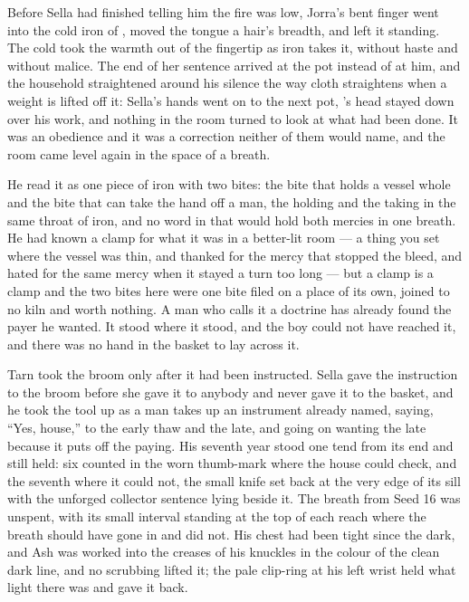 Before Sella had finished telling him the fire was low, Jorra's bent finger went into the cold iron of , moved the tongue a hair's breadth, and left it standing. The cold took the warmth out of the fingertip as iron takes it, without haste and without malice. The end of her sentence arrived at the pot instead of at him, and the household straightened around his silence the way cloth straightens when a weight is lifted off it: Sella's hands went on to the next pot, 's head stayed down over his work, and nothing in the room turned to look at what had been done. It was an obedience and it was a correction neither of them would name, and the room came level again in the space of a breath.

He read it as one piece of iron with two bites: the bite that holds a vessel whole and the bite that can take the hand off a man, the holding and the taking in the same throat of iron, and no word in  that would hold both mercies in one breath. He had known a clamp for what it was in a better-lit room --- a thing you set where the vessel was thin, and thanked for the mercy that stopped the bleed, and hated for the same mercy when it stayed a turn too long --- but a clamp is a clamp and the two bites here were one bite filed on a place of its own, joined to no kiln and worth nothing. A man who calls it a doctrine has already found the payer he wanted. It stood where it stood, and the boy could not have reached it, and there was no hand in the basket to lay across it.

Tarn took the broom only after it had been instructed. Sella gave the instruction to the broom before she gave it to anybody and never gave it to the basket, and he took the tool up as a man takes up an instrument already named, saying, “Yes, house,” to the early thaw and the late, and going on wanting the late because it puts off the paying. His seventh year stood one tend from its end and still held: six counted in the worn thumb-mark where the house could check, and the seventh where it could not, the small knife set back at the very edge of its sill with the unforged collector sentence lying beside it. The breath from Seed 16 was unspent, with its small interval standing at the top of each reach where the breath should have gone in and did not. His chest had been tight since the dark, and Ash was worked into the creases of his knuckles in the colour of the clean dark line, and no scrubbing lifted it; the pale clip-ring at his left wrist held what light there was and gave it back.

